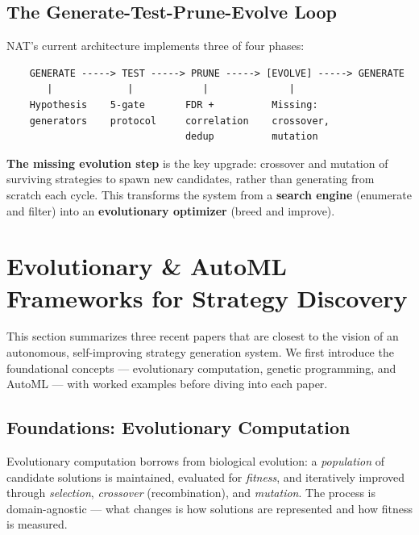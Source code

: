 \documentclass[11pt,a4paper]{article}
\begin{document}
\subsection{The Generate-Test-Prune-Evolve Loop}

NAT's current architecture implements three of four phases:

\begin{verbatim}
    GENERATE -----> TEST -----> PRUNE -----> [EVOLVE] -----> GENERATE
       |             |            |              |
    Hypothesis    5-gate       FDR +          Missing:
    generators    protocol     correlation    crossover,
                               dedup          mutation
\end{verbatim}

\textbf{The missing evolution step} is the key upgrade: crossover and mutation of surviving strategies to spawn new candidates, rather than generating from scratch each cycle. This transforms the system from a \textbf{search engine} (enumerate and filter) into an \textbf{evolutionary optimizer} (breed and improve).

\newpage
\section{Evolutionary \& AutoML Frameworks for Strategy Discovery}

This section summarizes three recent papers that are closest to the vision of an autonomous, self-improving strategy generation system. We first introduce the foundational concepts --- evolutionary computation, genetic programming, and AutoML --- with worked examples before diving into each paper.

\subsection{Foundations: Evolutionary Computation}

Evolutionary computation borrows from biological evolution: a \textit{population} of candidate solutions is maintained, evaluated for \textit{fitness}, and iteratively improved through \textit{selection}, \textit{crossover} (recombination), and \textit{mutation}. The process is domain-agnostic --- what changes is how solutions are represented and how fitness is measured.
\end{document}
